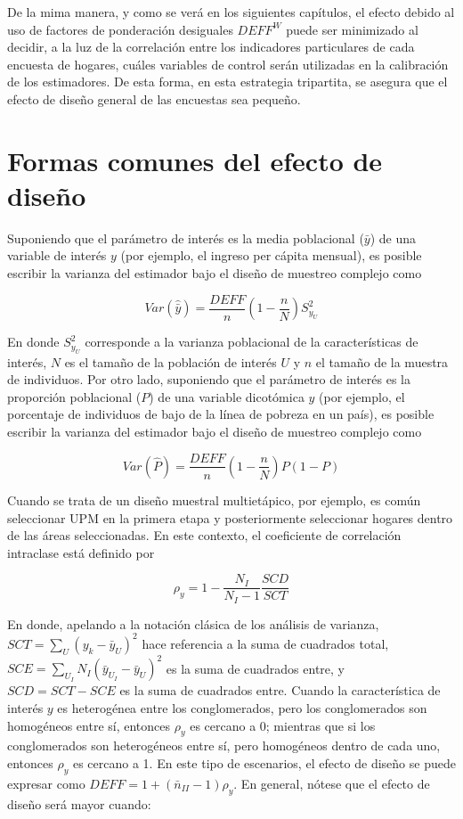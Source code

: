 \documentclass[
  12pt,
  spanish,
]{book}
\begin{document}
De la mima manera, y como se verá en los siguientes capítulos, el efecto debido al uso de factores de ponderación desiguales \(DEFF^W\) puede ser minimizado al decidir, a la luz de la correlación entre los indicadores particulares de cada encuesta de hogares, cuáles variables de control serán utilizadas en la calibración de los estimadores. De esta forma, en esta estrategia tripartita, se asegura que el efecto de diseño general de las encuestas sea pequeño.

\hypertarget{formas-comunes-del-efecto-de-diseuxf1o}{%
\section{Formas comunes del efecto de diseño}\label{formas-comunes-del-efecto-de-diseuxf1o}}

Suponiendo que el parámetro de interés es la media poblacional (\(\bar{y}\)) de una variable de interés \(y\) (por ejemplo, el ingreso per cápita mensual), es posible escribir la varianza del estimador bajo el diseño de muestreo complejo como

\[
Var(\hat{\bar{y}}) = \frac{DEFF}{n}\left(1-\frac{n}{N}\right)S^2_{y_U}
\]

En donde \(S^2_{y_U}\) corresponde a la varianza poblacional de la características de interés, \(N\) es el tamaño de la población de interés \(U\) y \(n\) el tamaño de la muestra de individuos. Por otro lado, suponiendo que el parámetro de interés es la proporción poblacional (\(P\)) de una variable dicotómica \(y\) (por ejemplo, el porcentaje de individuos de bajo de la línea de pobreza en un país), es posible escribir la varianza del estimador bajo el diseño de muestreo complejo como

\[
Var(\hat P) = \frac{DEFF}{n}\left(1-\frac{n}{N}\right)P(1-P)
\]

Cuando se trata de un diseño muestral multietápico, por ejemplo, es común seleccionar UPM en la primera etapa y posteriormente seleccionar hogares dentro de las áreas seleccionadas. En este contexto, el coeficiente de correlación intraclase está definido por

\[
\rho_y=1-\frac{N_I}{N_I-1}\frac{SCD}{SCT}
\]

En donde, apelando a la notación clásica de los análisis de varianza, \(SCT=\sum_{U}{(y_k-{\bar{y}}_U)}^2\) hace referencia a la suma de cuadrados total, \(SCE=\sum_{U_I} N_I{({\bar{y}}_{U_I}-{\bar{y}}_U)}^2\) es la suma de cuadrados entre, y \(SCD=SCT-SCE\) es la suma de cuadrados entre. Cuando la característica de interés \(y\) es heterogénea entre los conglomerados, pero los conglomerados son homogéneos entre sí, entonces \(\rho_y\) es cercano a 0; mientras que si los conglomerados son heterogéneos entre sí, pero homogéneos dentro de cada uno, entonces \(\rho_y\) es cercano a 1. En este tipo de escenarios, el efecto de diseño se puede expresar como \(DEFF = 1 + (\bar{n}_{II}-1)\rho_y\). En general, nótese que el efecto de diseño será mayor cuando:
\end{document}
